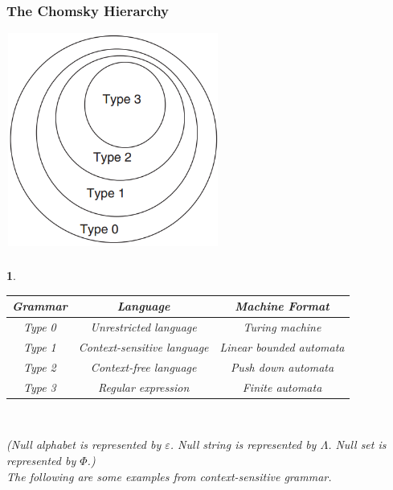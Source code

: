 \documentclass[12pt]{beamer}
\newtheorem{tex}{}
\begin{document}
\begin{frame}
	
	\frametitle{The Chomsky Hierarchy}
	
	\centering\includegraphics[height=7cm,width=7cm]{the chomsky hierarchy.jpg}
	
\end{frame}	


\begin{frame}
	
	\frametitle{}
	
	\begin{tex}
	\begin{center}
		\begin{tabular}{ccc}
			\hline
			Grammar &  Language & Machine Format\\
			\hline
			Type 0 & Unrestricted language & Turing machine\\
			Type 1 & Context-sensitive language & Linear bounded automata\\
			Type 2 & Context-free language & Push down automata\\
			Type 3 & Regular expression & Finite automata\\
			\hline
		\end{tabular}\\
	\end{center}
	
	(Null alphabet is represented by $\varepsilon$. Null string is represented by $\Lambda$. Null set is represented by $\Phi$.)\\
	The following are some examples from context-sensitive grammar.\\
\end{tex}
	
\end{frame}	
\end{document}
